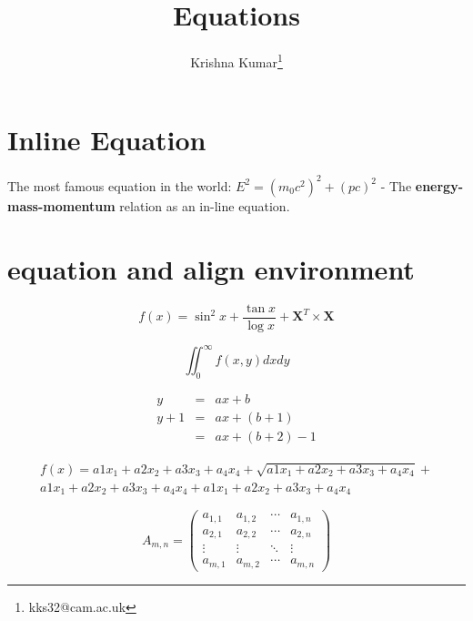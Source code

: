 \documentclass{article}
\title{Equations}
\author{Krishna Kumar\thanks{kks32@cam.ac.uk}}
\date{}
\begin{document}
\maketitle

\section*{Inline Equation}

The most famous equation in the world: $E^2 = (m_0c^2)^2 + (pc)^2$ - The \textbf{energy-mass-momentum} relation as an in-line equation.

\section{equation and align environment}
\begin{equation}
 f(x)= \sin^2x+\frac{\tan \mathit{x}}{\log \mathit{x}} + \mathbf{X}^T\times\mathbf{X}
\end{equation}

\begin{equation*}
\iint_{0}^{\infty}   f(x,y)dx dy
\end{equation*}

\begin{eqnarray}
	y   & = & ax+b \nonumber\\
	y+1 & = & ax+(b+1)\\
	    & = & ax+(b+2)-1
\end{eqnarray}

\begin{multline}
f(x)=a1x_1+a2x_2+a3x_3+a_4x_4+
\sqrt{a1x_1+a2x_2+a3x_3+a_4x_4}+\\
a1x_1+a2x_2+a3x_3+a_4x_4+
a1x_1+a2x_2+a3x_3+a_4x_4
\end{multline}

\begin{equation}
A_{m,n} =
 \begin{pmatrix}
  a_{1,1} & a_{1,2} & \cdots & a_{1,n} \\
  a_{2,1} & a_{2,2} & \cdots & a_{2,n} \\
  \vdots  & \vdots  & \ddots & \vdots  \\
  a_{m,1} & a_{m,2} & \cdots & a_{m,n}
 \end{pmatrix}
\end{equation}
\end{document}
